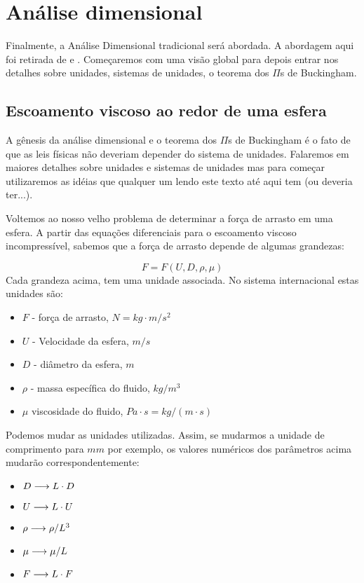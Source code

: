 \section{Análise dimensional}
\label{sec:adim}

Finalmente, a Análise Dimensional tradicional será abordada. A abordagem aqui foi retirada de  e . Começaremos com  uma visão global para depois entrar nos detalhes sobre unidades, sistemas de unidades, o teorema dos $\Pi$s de Buckingham.

\subsection{Escoamento viscoso ao redor de uma esfera}

A gênesis da análise dimensional e o teorema dos $\Pi$s de Buckingham é o fato de que as leis físicas não deveriam depender do sistema de unidades. Falaremos em maiores detalhes sobre unidades e sistemas de unidades mas para começar utilizaremos as idéias que qualquer um lendo este texto até aqui tem (ou deveria ter...).

Voltemos ao nosso velho problema de determinar a força de arrasto em uma esfera. A partir das equações diferenciais para o escoamento viscoso incompressível, sabemos que a força de arrasto depende de algumas grandezas:

\[
F = F(U, D, \rho, \mu)
\]
Cada grandeza acima, tem uma unidade associada. No sistema internacional estas unidades são:

\begin{itemize}
\item $F$ - força de arrasto, $N=kg\cdot m/s^2$
\item $U$ - Velocidade da esfera, $m/s$
\item $D$ - diâmetro da esfera, $m$
\item $\rho$ - massa específica do fluido, $kg/m^3$
\item $\mu$ viscosidade do fluido, $Pa\cdot s = kg/(m\cdot s)$
\end{itemize}

Podemos mudar as unidades utilizadas. Assim, se mudarmos a unidade de comprimento para $mm$ por exemplo, os valores numéricos dos parâmetros acima mudarão correspondentemente:

\begin{itemize}
\item $D \longrightarrow L \cdot D$
\item $U \longrightarrow L \cdot U$
\item $\rho \longrightarrow  \rho / L^3$
\item $\mu \longrightarrow \mu / L$
\item $F \longrightarrow L \cdot F$
\end{itemize}


